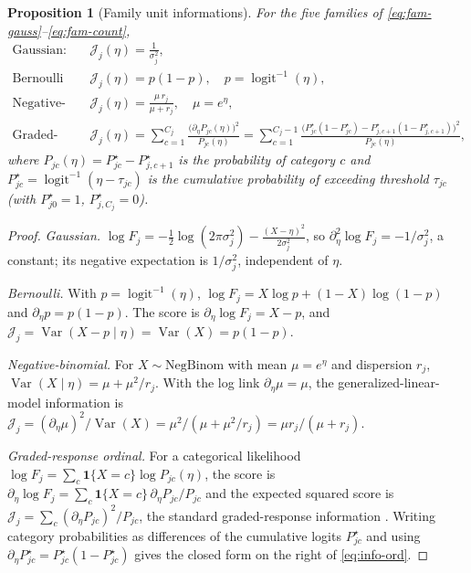 \documentclass[11pt]{article}
\newcommand{\unitinfo}{\mathcal{J}}
\theoremstyle{plain}
\newtheorem{proposition}{Proposition}
\theoremstyle{definition}
\begin{document}
\begin{proposition}[Family unit informations]\label{prop:families}
For the five families of \eqref{eq:fam-gauss}--\eqref{eq:fam-count},
\begin{align}
  \text{Gaussian:}\quad & \unitinfo_j(\eta)=\frac{1}{\sigma_j^2}, \label{eq:info-gauss}\\
  \text{Bernoulli (logit):}\quad & \unitinfo_j(\eta)=p(1-p),\quad p=\operatorname{logit}^{-1}(\eta), \label{eq:info-bern}\\
  \text{Negative-binomial (log link):}\quad & \unitinfo_j(\eta)=\frac{\mu\,r_j}{\mu+r_j},\quad \mu=e^{\eta}, \label{eq:info-nb}\\
  \text{Graded-response ordinal:}\quad & \unitinfo_j(\eta)=\sum_{c=1}^{C_j}\frac{\bigl(\partial_\eta P_{jc}(\eta)\bigr)^2}{P_{jc}(\eta)}
    =\sum_{c=1}^{C_j-1}\frac{\bigl(P_{jc}^{\star}(1-P_{jc}^{\star})-P_{j,c+1}^{\star}(1-P_{j,c+1}^{\star})\bigr)^2}{P_{jc}(\eta)}, \label{eq:info-ord}
\end{align}
where $P_{jc}(\eta)=P_{jc}^{\star}-P_{j,c+1}^{\star}$ is the probability of category $c$ and
$P_{jc}^{\star}=\operatorname{logit}^{-1}(\eta-\tau_{jc})$ is the cumulative probability of
exceeding threshold $\tau_{jc}$ (with $P_{j0}^{\star}=1$, $P_{j,C_j}^{\star}=0$).
\end{proposition}
\begin{proof}
\emph{Gaussian.} $\log F_j=-\tfrac12\log(2\pi\sigma_j^2)-\tfrac{(X-\eta)^2}{2\sigma_j^2}$, so
$\partial_\eta^2\log F_j=-1/\sigma_j^2$, a constant; its negative expectation is
$1/\sigma_j^2$, independent of $\eta$.

\emph{Bernoulli.} With $p=\operatorname{logit}^{-1}(\eta)$,
$\log F_j=X\log p+(1-X)\log(1-p)$ and $\partial_\eta p=p(1-p)$. The score is
$\partial_\eta\log F_j=X-p$, and
$\unitinfo_j=\operatorname{Var}(X-p\mid\eta)=\operatorname{Var}(X)=p(1-p)$.

\emph{Negative-binomial.} For $X\sim\mathrm{NegBinom}$ with mean $\mu=e^\eta$ and dispersion
$r_j$, $\operatorname{Var}(X\mid\eta)=\mu+\mu^2/r_j$. With the log link
$\partial_\eta\mu=\mu$, the generalized-linear-model information is
$\unitinfo_j=(\partial_\eta\mu)^2/\operatorname{Var}(X)=\mu^2/(\mu+\mu^2/r_j)=\mu r_j/(\mu+r_j)$.

\emph{Graded-response ordinal.} For a categorical likelihood
$\log F_j=\sum_c \mathbf 1\{X=c\}\log P_{jc}(\eta)$, the score is
$\partial_\eta\log F_j=\sum_c\mathbf 1\{X=c\}\,\partial_\eta P_{jc}/P_{jc}$ and the expected
squared score is $\unitinfo_j=\sum_c(\partial_\eta P_{jc})^2/P_{jc}$, the standard
graded-response information \citep{samejima1969}. Writing category probabilities as
differences of the cumulative logits $P_{jc}^\star$ and using
$\partial_\eta P_{jc}^\star=P_{jc}^\star(1-P_{jc}^\star)$ gives the closed form on the right
of \eqref{eq:info-ord}.
\end{proof}
\end{document}
